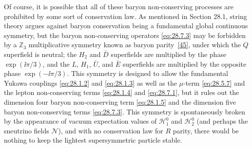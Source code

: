 Of course, it is possible that all of these baryon non-conserving processes
are prohibited by some sort of conservation law. As mentioned in Section
28.1, string theory argues against baryon conservation being a fundamental
global continuous symmetry, but the baryon non-conserving operators
\eqref{eq:28.7.3} may be forbidden by a \(\mathbb Z_3\) multiplicative
symmetry known as baryon parity~\hyperref[ch28-ref-45]{[45]}, under which the \(Q\)
superfield is neutral; the \(H_2\) and \(\bar D\) superfields are multiplied
by the phase \(\exp(\ii\pi/3)\), and the \(L\), \(H_1\), \(\bar U\), and
\(\bar E\) superfields are multiplied by the opposite phase
\(\exp(-\ii\pi/3)\). This symmetry is designed to allow the fundamental
Yukawa couplings \eqref{eq:28.1.2} and \eqref{eq:28.1.3} as well as the
\(\mu\)-term \eqref{eq:28.5.7} and the lepton non-conserving terms
\eqref{eq:28.1.4} and \eqref{eq:28.7.1}, but it rules out the dimension
four baryon non-conserving term \eqref{eq:28.1.5} and the dimension five
baryon non-conserving terms \eqref{eq:28.7.3}. This symmetry is
spontaneously broken by the appearance of vacuum expectation values of
\(\mathcal H_1^0\) and \(\mathcal H_2^0\) (and perhaps the sneutrino fields
\(\mathcal N\)), and with no conservation law for \(R\) parity, there would
be nothing to keep the lightest supersymmetric particle stable.
